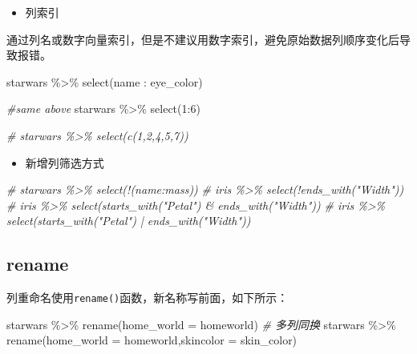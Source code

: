 \documentclass[
]{book}
\newenvironment{Shaded}{\begin{snugshade}}{\end{snugshade}}
\newcommand{\AttributeTok}[1]{\textcolor[rgb]{0.77,0.63,0.00}{#1}}
\newcommand{\CommentTok}[1]{\textcolor[rgb]{0.56,0.35,0.01}{\textit{#1}}}
\newcommand{\DecValTok}[1]{\textcolor[rgb]{0.00,0.00,0.81}{#1}}
\newcommand{\FunctionTok}[1]{\textcolor[rgb]{0.00,0.00,0.00}{#1}}
\newcommand{\NormalTok}[1]{#1}
\newcommand{\SpecialCharTok}[1]{\textcolor[rgb]{0.00,0.00,0.00}{#1}}
\providecommand{\tightlist}{%
  \setlength{\itemsep}{0pt}\setlength{\parskip}{0pt}}
\begin{document}
\begin{itemize}
\tightlist
\item
  列索引
\end{itemize}

通过列名或数字向量索引，但是不建议用数字索引，避免原始数据列顺序变化后导致报错。

\begin{Shaded}
\begin{Highlighting}[]
\NormalTok{starwars }\SpecialCharTok{\%\textgreater{}\%} 
  \FunctionTok{select}\NormalTok{(name }\SpecialCharTok{:}\NormalTok{ eye\_color)}

\CommentTok{\#same above}
\NormalTok{starwars }\SpecialCharTok{\%\textgreater{}\%} 
  \FunctionTok{select}\NormalTok{(}\DecValTok{1}\SpecialCharTok{:}\DecValTok{6}\NormalTok{)}

\CommentTok{\# starwars \%\textgreater{}\% select(c(1,2,4,5,7))}
\end{Highlighting}
\end{Shaded}

\begin{itemize}
\tightlist
\item
  新增列筛选方式
\end{itemize}

\begin{Shaded}
\begin{Highlighting}[]
\CommentTok{\# starwars \%\textgreater{}\% select(!(name:mass))}
\CommentTok{\# iris \%\textgreater{}\% select(!ends\_with("Width"))}
\CommentTok{\# iris \%\textgreater{}\% select(starts\_with("Petal") \& ends\_with("Width"))}
\CommentTok{\# iris \%\textgreater{}\% select(starts\_with("Petal") | ends\_with("Width"))}
\end{Highlighting}
\end{Shaded}

\hypertarget{dplyr-rename}{%
\subsection{rename}\label{dplyr-rename}}

列重命名使用\texttt{rename()}函数，新名称写前面，如下所示：

\begin{Shaded}
\begin{Highlighting}[]
\NormalTok{starwars }\SpecialCharTok{\%\textgreater{}\%} \FunctionTok{rename}\NormalTok{(}\AttributeTok{home\_world =}\NormalTok{ homeworld)}
\CommentTok{\# 多列同换}
\NormalTok{starwars }\SpecialCharTok{\%\textgreater{}\%} \FunctionTok{rename}\NormalTok{(}\AttributeTok{home\_world =}\NormalTok{ homeworld,}\AttributeTok{skincolor =}\NormalTok{ skin\_color)}
\end{Highlighting}
\end{Shaded}
\end{document}
